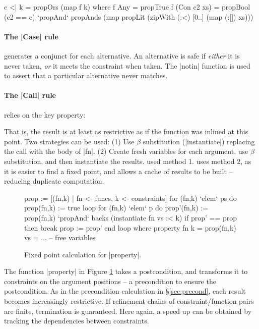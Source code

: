 \begin{code}
c <| k = propOrs (map f k)
    where
    f Any = propTrue
    f (Con c2 xs) = propBool (c2 == c) `propAnd`
        propAnds (map propLit (zipWith (:<) [0..] (map (:[]) xs)))
\end{code}

\paragraph{The |Case| rule} generates a conjunct for each alternative. An alternative is safe if \textit{either} it is never taken, \textit{or} it meets the constraint when taken. The |notin| function is used to assert that a particular alternative never matches.

\paragraph{The |Call| rule} relies on the key property:


That is, the result is at least as restrictive as if the function was inlined at this point. Two strategies can be used: (1) Use $\beta$ substitution (|instantiate|) replacing the call with the body of |fn|. (2) Create fresh variables for each argument, use $\beta$ substitution, and then instantiate the results. \oldtool{} used method 1. \newtool{} uses method 2, as it is easier to find a fixed point, and allows a cache of results to be built -- reducing duplicate computation.

\begin{figure}
\ignore\begin{code}
prop := [(fn,k) | fn <- funcs, k <- constraints]
for (fn,k) `elem` ps do prop(fn,k) := true
loop
    for (fn,k) `elem` p do
        prop'(fn,k) := prop(fn,k) `propAnd` backs (instantiate fn vs :< k)
    if prop' == prop then break
    prop := prop'
end loop
    where
        property fn k = prop(fn,k)
        vs = ... -- free variables
\end{code}
\caption{Fixed point calculation for |property|.}
\label{fig:property_fixp}
\figureend
\end{figure}

The function |property| in Figure \ref{fig:property_fixp} takes a postcondition, and transforms it to constraints on the argument positions -- a precondition to ensure the postcondition. As in the precondition calculation in \S\ref{sec:precond}, each result becomes increasingly restrictive. If refinement chains of constraint/function pairs are finite, termination is guaranteed. Here again, a speed up can be obtained by tracking the dependencies between constraints.

